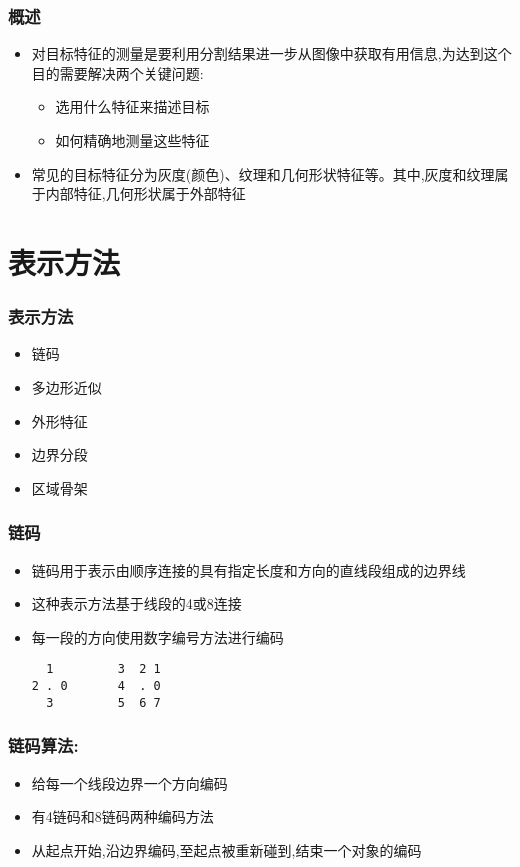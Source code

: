 \documentclass{beamer}
\begin{document}
\begin{frame}
\frametitle{概述}
\label{sec-1-4}

\begin{itemize}
\item 对目标特征的测量是要利用分割结果进一步从图像中获取有用信息,为达到这个目的需要解决两个关键问题:
\begin{itemize}
\item 选用什么特征来描述目标
\item 如何精确地测量这些特征
\end{itemize}
\item 常见的目标特征分为灰度(颜色)、纹理和几何形状特征等。其中,灰度和纹理属于内部特征,几何形状属于外部特征
\end{itemize}
\end{frame}
\section{表示方法}
\label{sec-2}
\begin{frame}
\frametitle{表示方法}
\label{sec-2-1}

\begin{itemize}
\item 链码
\item 多边形近似
\item 外形特征
\item 边界分段
\item 区域骨架
\end{itemize}
\end{frame}
\begin{frame}[fragile]
\frametitle{链码}
\label{sec-2-2}

\begin{itemize}
\item 链码用于表示由顺序连接的具有指定长度和方向的直线段组成的边界线
\item 这种表示方法基于线段的4或8连接
\item 每一段的方向使用数字编号方法进行编码

\begin{verbatim}
  1         3  2 1
2 . 0       4  . 0
  3         5  6 7
\end{verbatim}
\end{itemize}
\end{frame}
\begin{frame}
\frametitle{链码算法:}
\label{sec-2-3}

\begin{itemize}
\item 给每一个线段边界一个方向编码
\item 有4链码和8链码两种编码方法
\item 从起点开始,沿边界编码,至起点被重新碰到,结束一个对象的编码
\end{itemize}
\end{frame}
\end{document}
